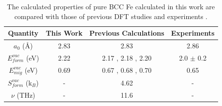 \documentclass[preprint,12pt]{elsarticle}
\begin{document}

\begin{table}[!h]
    \centering
    \caption{The calculated properties of pure BCC Fe calculated in this work are compared with those of previous DFT studies \cite{messina_exact_2014,murali_bcc_fe_2015, yang_significant_2023, messina_systematic_2016, Li_magnetic_2021,  choudhury2011ab} and experiments \cite{kittel2018introduction, schepper_positron1983, tapasa2007computer}. } 
    \label{tab:bulk_properties}
    \begin{tabular}{|c|c|c|c|}
       \hline
       Quantity& This Work& Previous Calculations  & Experiments  \\
       \hline
       $a_0$ (\AA)& 2.83 & 2.83 \cite{messina_exact_2014, yang_significant_2023}  & 2.86 \cite{kittel2018introduction} \\
       \hline
       $E_{form}^{vac}$ (eV)&2.22 &2.17 \cite{yang_significant_2023}, 2.18 \cite{messina_exact_2014, SHANG2016128}, 2.20 \cite{murali_bcc_fe_2015, Li_magnetic_2021}& 2.0 $\pm$ 0.2 \cite{schepper_positron1983} \\
       \hline
       $E_{mig}^{vac}$ (eV) &0.69 & 0.67 \cite{choudhury2011ab}, 0.68 \cite{murali_bcc_fe_2015}, 0.70 \cite{messina_exact_2014, yang_significant_2023} &  0.65 \cite{tapasa2007computer} \\
       \hline
       $S_{form}^{vac}$ (k$_B$) &- & 4.62 \cite{messina_systematic_2016} &- \\
       \hline
       $\nu$ (THz) &- & 11.6 \cite{messina_systematic_2016} &- \\
       \hline
    \end{tabular}
\end{table}
\end{document}
